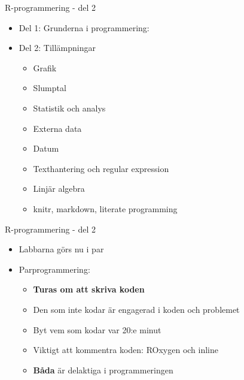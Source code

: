 \documentclass[
  11pt,
  ignorenonframetext,
  handout]{beamer}
\providecommand{\tightlist}{%
  \setlength{\itemsep}{0pt}\setlength{\parskip}{0pt}}
\newcommand\imp[1]{\alert{\textbf{#1}}}
\begin{document}
\begin{frame}{R-programmering - del 2}
\protect\hypertarget{r-programmering---del-2-1}{}
\begin{itemize}
\tightlist
\item
  Del 1: Grunderna i programmering:
\item
  Del 2: Tillämpningar

  \begin{itemize}
  \tightlist
  \item
    Grafik
  \item
    Slumptal
  \item
    Statistik och analys
  \item
    Externa data
  \item
    Datum
  \item
    Texthantering och regular expression
  \item
    Linjär algebra
  \item
    knitr, markdown, literate programming
  \end{itemize}
\end{itemize}
\end{frame}

\begin{frame}{R-programmering - del 2}
\protect\hypertarget{r-programmering---del-2-2}{}
\begin{itemize}
\tightlist
\item
  Labbarna görs nu i par
\item
  Parprogrammering:

  \begin{itemize}
  \item
    \imp{Turas om att skriva koden}
  \item
    Den som inte kodar är engagerad i koden och problemet
  \item
    Byt vem som kodar var 20:e minut
  \item
    Viktigt att kommentra koden: ROxygen och inline
  \item
    \imp{Båda} är delaktiga i programmeringen
  \end{itemize}
\end{itemize}
\end{frame}
\end{document}

